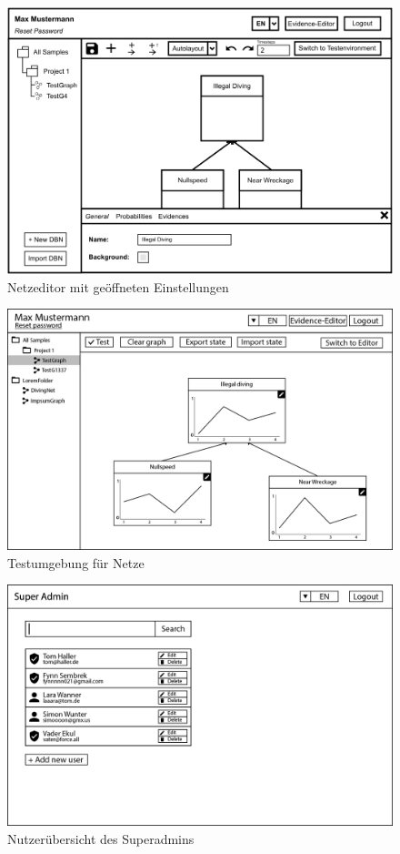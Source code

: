 \documentclass[parskip=full,11pt,twoside]{scrartcl}
\begin{document}
\begin{figure}[ht!]
  \includegraphics[scale = 0.8]{image/editor_properties.png}
  \caption{Netzeditor mit geöffneten Einstellungen}
  \label{fig:neteditorproperties}
\end{figure}

\begin{figure}[ht!]
  \includegraphics[width=\linewidth]{image/GUI-4.png}
  \caption{Testumgebung für Netze}
  \label{fig:testEdit}
\end{figure}

\begin{figure}[ht!]
  \includegraphics[width=\linewidth]{image/GUI-1.png}
  \caption{Nutzerübersicht des Superadmins}
  \label{fig:saUserview}
\end{figure}
\end{document}
